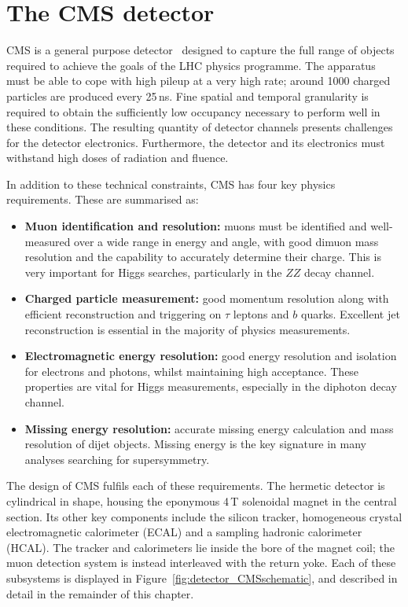 \section{The CMS detector}

CMS is a general purpose detector~\cite{CMSdetector} designed to capture the full range of objects required to achieve the goals of the LHC physics programme.
The apparatus must be able to cope with high pileup at a very high rate; around 1000 charged particles are produced every 25\,ns.
Fine spatial and temporal granularity is required to obtain the sufficiently low occupancy necessary to perform well in these conditions.
The resulting quantity of detector channels presents challenges for the detector electronics.
Furthermore, the detector and its electronics must withstand high doses of radiation and fluence.

In addition to these technical constraints, CMS has four key physics requirements.
These are summarised as:
\begin{itemize}
  \item{\textbf{Muon identification and resolution:}
  muons must be identified and well-measured over a wide range in energy and angle, 
  with good dimuon mass resolution and the capability to accurately determine their charge.
  This is very important for Higgs searches, particularly in the $ZZ$ decay channel.}
  \item{\textbf{Charged particle measurement:}
  good momentum resolution along with efficient reconstruction and triggering on $\tau$ leptons and $b$ quarks.
  Excellent jet reconstruction is essential in the majority of physics measurements.}
  \item{\textbf{Electromagnetic energy resolution:}
  good energy resolution and isolation for electrons and photons, whilst maintaining high acceptance.
  These properties are vital for Higgs measurements, especially in the diphoton decay channel.}
  \item{\textbf{Missing energy resolution:}
  accurate missing energy calculation and mass resolution of dijet objects.
  Missing energy is the key signature in many analyses searching for supersymmetry.}
\end{itemize}

The design of CMS fulfils each of these requirements.
The hermetic detector is cylindrical in shape, 
housing the eponymous 4\,T solenoidal magnet in the central section.
Its other key components include the silicon tracker, 
homogeneous crystal electromagnetic calorimeter (ECAL) and a sampling hadronic calorimeter (HCAL).
The tracker and calorimeters lie inside the bore of the magnet coil; 
the muon detection system is instead interleaved with the return yoke.
Each of these subsystems is displayed in Figure~\ref{fig:detector_CMSschematic}, 
and described in detail in the remainder of this chapter.

